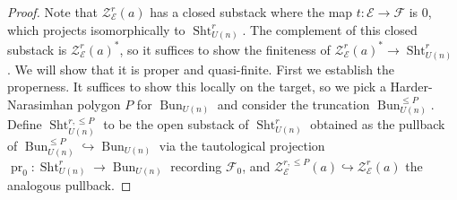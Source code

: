 \documentclass[reqno]{amsart}
\numberwithin{equation}{section}
\newcommand{\Cal}[1]{\mathcal{#1}}
\newcommand{\co}{\colon}
\newcommand{\inj}{\hookrightarrow}
\DeclareMathOperator{\Bun}{Bun}
\DeclareMathOperator{\Sht}{Sht}
\DeclareMathOperator{\pr}{pr}
\newcommand\cE{\mathcal{E}}
\newcommand\cF{\mathcal{F}}
\theoremstyle{remark}
\numberwithin{equation}{section}
\begin{document}
\begin{proof}
Note that $\Cal{Z}_{\Cal{E}}^{r}(a)$ has a closed substack where the map $t \co \cE \rightarrow \cF$ is $0$, which projects isomorphically to $\Sht_{U(n)}^r$. The complement of this closed substack is $\Cal{Z}_{\Cal{E}}^{r}(a)^*$, so it suffices to show the finiteness of $\Cal{Z}_{\Cal{E}}^{r}(a)^* \rightarrow \Sht_{U(n)}^{r}$. We will show that it is proper and quasi-finite. First we establish the properness. It suffices to show this locally on the target, so we pick a Harder-Narasimhan polygon $P$ for $\Bun_{U(n)}$ and consider the truncation $\Bun_{U(n)}^{\leq P}$. Define $\Sht_{U(n)}^{r, \leq P} $ to be the open substack of $\Sht_{U(n)}^r$ obtained as the pullback of $\Bun_{U(n)}^{\leq P} \inj \Bun_{U(n)}$ via the tautological projection $\pr_{0}: \Sht_{U(n)}^r \rightarrow \Bun_{U(n)}$ recording $\cF_{0}$, and $\Cal{Z}_{\Cal{E}}^{r, \leq P}(a) \inj \Cal{Z}_{\Cal{E}}^{r}(a)$ the analogous pullback.  


\end{proof}
\end{document}
